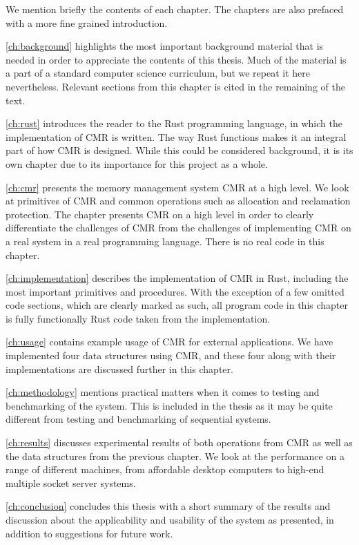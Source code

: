 We mention briefly the contents of each chapter. The chapters are also prefaced with a more fine
grained introduction.

\cref{ch:background} highlights the most important background material that is needed in order to
appreciate the contents of this thesis. Much of the material is a part of a standard computer
science curriculum, but we repeat it here nevertheless. Relevant sections from this chapter is
cited in the remaining of the text.

\cref{ch:rust} introduces the reader to the Rust programming language, in which the implementation
of CMR is written. The way Rust functions makes it an integral part of how CMR is designed. While
this could be considered background, it is its own chapter due to its importance for this project as
a whole.

\cref{ch:cmr} presents the memory management system CMR at a high level.  We look at primitives of
CMR and common operations such as allocation and reclamation protection.  The chapter presents CMR
on a high level in order to clearly differentiate the challenges of CMR from the challenges of
implementing CMR on a real system in a real programming language. There is no real code in this
chapter.

\cref{ch:implementation} describes the implementation of CMR in Rust, including the most important
primitives and procedures. With the exception of a few omitted code sections, which are clearly
marked as such, all program code in this chapter is fully functionally Rust code taken from the
implementation.

\cref{ch:usage} contains example usage of CMR for external applications. We have implemented four
data structures using CMR, and these four along with their implementations are discussed further in
this chapter.

\cref{ch:methodology} mentions practical matters when it comes to testing and benchmarking of the
system. This is included in the thesis as it may be quite different from testing and benchmarking
of sequential systems.

\cref{ch:results} discusses experimental results of both operations from CMR as well as the data
structures from the previous chapter. We look at the performance on a range of different machines,
from affordable desktop computers to high-end multiple socket server systems.

\cref{ch:conclusion} concludes this thesis with a short summary of the results and discussion about
the applicability and usability of the system as presented, in addition to suggestions for future
work.
